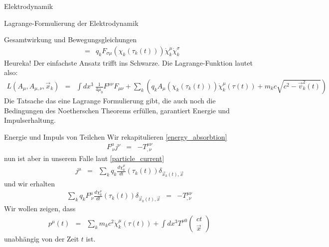 \begin{chapter}{\titlestr}
\begin{section}{Elektrodynamik}
\begin{subsection}{Lagrange-Formulierung der Elektrodynamik}
\begin{subsubsection}{Gesamtwirkung und Bewegungsgleichungen}
\begin{eqnarray*}
&=&q_k F_{\sigma\mu}(\chi_k(\tau_k(t)))\dot{\chi}_k^\mu\dot{\chi}_k^\sigma
\end{eqnarray*}
Heureka! Der einfachste Ansatz trifft ins Schwarze. Die Lagrange-Funktion lautet also:
\begin{eqnarray*}
L(A_\mu, A_{\mu,\nu},\vec{x}_k) &=&\int dx^3\ \frac{1}{4\mu_0}F^{\mu\nu}F_{\mu\nu}+\sum_k\left(q_kA_\mu(\chi_k(\tau_k(t)))\dot{\chi}^\mu_k(\tau(t))
+m_kc \sqrt{c^2-\vec{v}_k^2(t)}\right)
\end{eqnarray*}Die Tatsache das eine Lagrange Formulierung gibt, die auch noch die Bedingungen des Noetherschen Theorems erfüllen,
garantiert Energie und Impulserhaltung.
\end{subsubsection}

\begin{subsubsection}{Energie und Impuls von Teilchen}
Wir rekapitulieren \ref{energy_absorbtion}
\begin{eqnarray*}
F^\mu_{\ \nu}j^\nu &=& -T^{\mu\nu}_{,\nu}
\end{eqnarray*}
nun ist aber in unserem Falle laut \ref{particle_current}
\begin{eqnarray*}
j ^\mu &=& \sum_k q_k \frac{d\chi_k^\mu}{dt}(\tau_k(t))\delta_{\vec{x}_k(t),\vec{x}}
\end{eqnarray*}
und wir erhalten
\begin{eqnarray*}
\sum_k q_k F^\mu_{\ \nu}\frac{d\chi_k^\nu}{dt}(\tau_k(t))\delta_{\vec{x}_k(t),\vec{x}} &=& -T^{\mu\nu}_{,\nu}
\end{eqnarray*}
Wir wollen zeigen, dass
\begin{eqnarray*}
p^\mu(t) &=& \sum_k m_kc^2 \dot{\chi}^\mu_k(\tau(t))+\int dx^3 T^{\mu 0}\begin{pmatrix}ct\\ \vec{x}\end{pmatrix}
\end{eqnarray*}
unabhängig von der Zeit $t$ ist.


\end{subsubsection}
\end{subsection}
\end{section}
\end{chapter}

